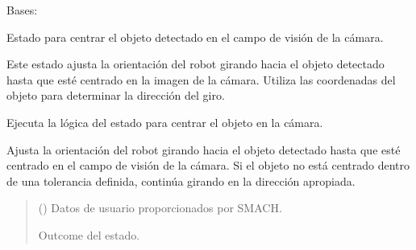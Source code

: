\documentclass[a4paper,10pt,spanish]{sphinxmanual}
\begin{document}
\begin{fulllineitems}
\label{\detokenize{squad_approach_control_action:squad_approach_control_action.CenterObjectState}}
\pysigstartsignatures
{}
\pysigstopsignatures
\sphinxAtStartPar
Bases: 

\sphinxAtStartPar
Estado para centrar el objeto detectado en el campo de visión de la cámara.

\sphinxAtStartPar
Este estado ajusta la orientación del robot girando hacia el objeto detectado hasta que
esté centrado en la imagen de la cámara. Utiliza las coordenadas del objeto para determinar
la dirección del giro.

\begin{fulllineitems}
\label{\detokenize{squad_approach_control_action:squad_approach_control_action.CenterObjectState.execute}}
\pysigstartsignatures
{}
\pysigstopsignatures
\sphinxAtStartPar
Ejecuta la lógica del estado para centrar el objeto en la cámara.

\sphinxAtStartPar
Ajusta la orientación del robot girando hacia el objeto detectado hasta que esté
centrado en el campo de visión de la cámara. Si el objeto no está centrado dentro
de una tolerancia definida, continúa girando en la dirección apropiada.
\begin{quote}\begin{description}
\sphinxAtStartPar
{} () \textendash{} Datos de usuario proporcionados por SMACH.

\sphinxAtStartPar
Outcome del estado.


\end{description}
\end{quote}
\end{fulllineitems}
\end{fulllineitems}
\end{document}
